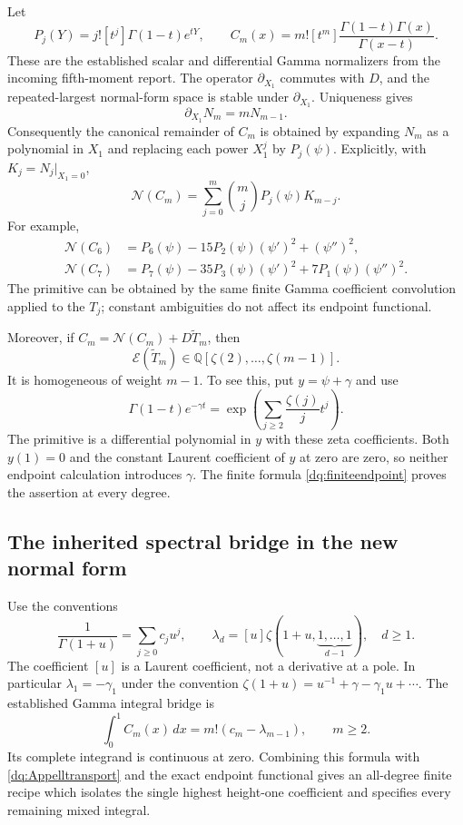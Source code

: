 Let
\[
 P_j(Y)=j![t^j]\Gamma(1-t)e^{tY},\qquad
 C_m(x)=m![t^m]\frac{\Gamma(1-t)\Gamma(x)}{\Gamma(x-t)}.
\]
These are the established scalar and differential Gamma normalizers
from the incoming fifth-moment report. The operator $\partial_{X_1}$
commutes with $D$, and the repeated-largest normal-form space is
stable under $\partial_{X_1}$. Uniqueness gives
\[
 \partial_{X_1}N_m=mN_{m-1}.
\]
Consequently the canonical remainder of $C_m$ is obtained by expanding
$N_m$ as a polynomial in $X_1$ and replacing each power $X_1^j$ by
$P_j(\psi)$. Explicitly, with $K_j=N_j|_{X_1=0}$,
\begin{equation}\label{dq:Appelltransport}
 \mathcal N(C_m)=\sum_{j=0}^m\binom mj P_j(\psi)K_{m-j}.
\end{equation}
For example,
\begin{align}
 \mathcal N(C_6)&=P_6(\psi)-15P_2(\psi)(\psi')^2+(\psi'')^2,
 \label{dq:C6normal}\\
 \mathcal N(C_7)&=P_7(\psi)-35P_3(\psi)(\psi')^2
                                  +7P_1(\psi)(\psi'')^2.
 \label{dq:C7normal}
\end{align}
The primitive can be obtained by the same finite Gamma coefficient
convolution applied to the $T_j$; constant ambiguities do not affect
its endpoint functional.

Moreover, if $C_m=\mathcal N(C_m)+D\widetilde T_m$, then
\begin{equation}\label{dq:Appellendpointalgebra}
 \mathcal E(\widetilde T_m)\in
            \mathbb Q[\zeta(2),\ldots,\zeta(m-1)].
\end{equation}
It is homogeneous of weight $m-1$. To see this, put $y=\psi+\gamma$
and use
\[
 \Gamma(1-t)e^{-\gamma t}
  =\exp\left(\sum_{j\ge2}\frac{\zeta(j)}j t^j\right).
\]
The primitive is a differential polynomial in $y$ with these zeta
coefficients. Both $y(1)=0$ and the constant Laurent coefficient of
$y$ at zero are zero, so neither endpoint calculation introduces
$\gamma$. The finite formula \eqref{dq:finiteendpoint} proves
the assertion at every degree.

\subsection{The inherited spectral bridge in the new normal form}

Use the conventions
\[
 \frac1{\Gamma(1+u)}=\sum_{j\ge0}c_ju^j,\qquad
 \lambda_d=[u]\zeta(1+u,\underbrace{1,\ldots,1}_{d-1}),
 \quad d\ge1.
\]
The coefficient $[u]$ is a Laurent coefficient, not a derivative at
a pole. In particular $\lambda_1=-\gamma_1$ under the convention
$\zeta(1+u)=u^{-1}+\gamma-\gamma_1u+\cdots$.
The established Gamma integral bridge is
\begin{equation}\label{dq:inheritedCbridge}
 \int_0^1C_m(x)\,dx=m!(c_m-\lambda_{m-1}),\qquad m\ge2.
\end{equation}
Its complete integrand is continuous at zero. Combining this formula
with \eqref{dq:Appelltransport} and the exact endpoint functional
gives an all-degree finite recipe which isolates the single highest
height-one coefficient and specifies every remaining mixed integral.

